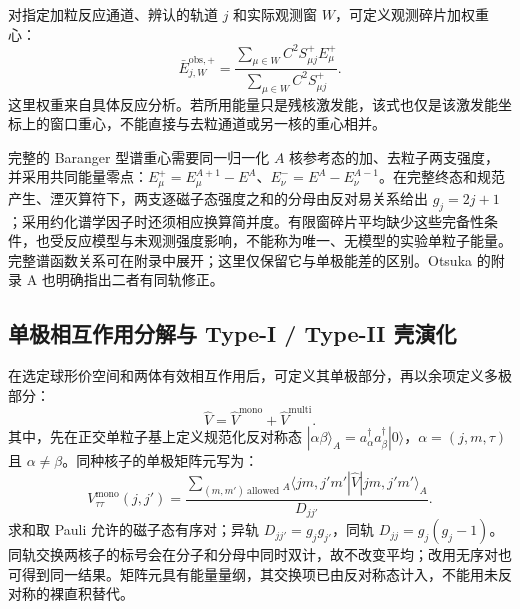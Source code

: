 对指定加粒反应通道、辨认的轨道 $j$ 和实际观测窗 $W$，可定义观测碎片加权重心：
\begin{equation}\label{eq:2-2-2}
\bar E^{\mathrm{obs},+}_{j,W}
=\frac{\sum_{\mu\in W}C^2S^+_{\mu j}E^+_\mu}
{\sum_{\mu\in W}C^2S^+_{\mu j}}.
\end{equation}
这里权重来自具体反应分析。若所用能量只是残核激发能，该式也仅是该激发能坐标上的窗口重心，不能直接与去粒通道或另一核的重心相并。

完整的 Baranger 型谱重心需要同一归一化 $A$ 核参考态的加、去粒子两支强度，并采用共同能量零点：$E^+_\mu=E^{A+1}_\mu-E^A$、$E^-_\nu=E^A-E^{A-1}_\nu$。在完整终态和规范产生、湮灭算符下，两支逐磁子态强度之和的分母由反对易关系给出 $g_j=2j+1$；采用约化谱学因子时还须相应换算简并度。有限窗碎片平均缺少这些完备性条件，也受反应模型与未观测强度影响，不能称为唯一、无模型的实验单粒子能量。完整谱函数关系可在附录中展开；这里仅保留它与单极能差的区别。Otsuka 的附录 A 也明确指出二者有同轨修正。\cite{doctoral-r1-g28-otsuka-2023-type-ii-shell-evolution}



\subsection{单极相互作用分解与 Type-I / Type-II 壳演化}\label{sec:2-2-2}


在选定球形价空间和两体有效相互作用后，可定义其单极部分，再以余项定义多极部分：\cite{doctoral-r1-g28-otsuka-2023-type-ii-shell-evolution}
\begin{equation}\label{eq:2-2-3}
\hat{V} = \hat{V}^{\mathrm{mono}} + \hat{V}^{\mathrm{multi}}.
\end{equation}
其中，先在正交单粒子基上定义规范化反对称态 $|\alpha\beta\rangle_A=a^\dagger_\alpha a^\dagger_\beta|0\rangle$，$\alpha=(j,m,\tau)$ 且 $\alpha\ne\beta$。同种核子的单极矩阵元写为：
\begin{equation}\label{eq:2-2-4}
V^{\mathrm{mono}}_{\tau\tau}(j,j')
=\frac{\sum_{(m,m')\ \mathrm{allowed}}
{}_A\langle jm,j'm'|\hat V|jm,j'm'\rangle_A}{D_{jj'}}.
\end{equation}
求和取 Pauli 允许的磁子态有序对；异轨 $D_{jj'}=g_jg_{j'}$，同轨 $D_{jj}=g_j(g_j-1)$。同轨交换两核子的标号会在分子和分母中同时双计，故不改变平均；改用无序对也可得到同一结果。矩阵元具有能量量纲，其交换项已由反对称态计入，不能用未反对称的裸直积替代。

